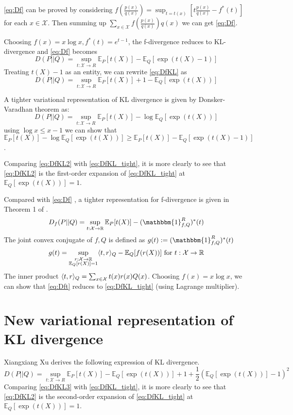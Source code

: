 \documentclass{article}
\theoremstyle{definition}
\DeclarePairedDelimiter{\ip}{\langle}{\rangle}
\begin{document}
\eqref{eq:Df} can be proved by considering
$f(\frac{p(x)}{q(x)}) = \sup_{t=t(x)} [t\frac{p(x)}{q(x)} - f^*(t)] $
for each $x\in \mathcal{X}$. Then summing up $\sum_{x\in\mathcal{X}} f(\frac{p(x)}{q(x)}) q(x)$
we can get \eqref{eq:Df}.

Choosing $f(x)=x\log x, f^*(t)=e^{t-1}$, the f-divergence reduces to KL-divergence and
\eqref{eq:Df} becomes
\begin{equation}\label{eq:DfKL}
D(P||Q) = \sup_{t: \mathcal{X} \to R} \mathbb{E}_P[t(X)] - \mathbb{E}_Q[\exp(t(X)-1)]
\end{equation}
Treating $t(X)-1$ as an entity, we can rewrite \eqref{eq:DfKL}
as
\begin{equation}\label{eq:DfKL2}
D(P||Q) = \sup_{t: \mathcal{X} \to R} \mathbb{E}_P[t(X)] + 1 - \mathbb{E}_Q[\exp(t(X))]
\end{equation}

A tighter variational representation of KL divergence is given 
by Donsker-Varadhan theorem as:
\begin{equation}\label{eq:DfKL_tight}
D(P||Q) = \sup_{t: \mathcal{X} \to R} \mathbb{E}_P[t(X)] - \log\mathbb{E}_Q[\exp(t(X))]
\end{equation}
using $\log x \leq x-1$ we can show that
$\mathbb{E}_P[t(X)] - \log\mathbb{E}_Q[\exp(t(X))]
\geq \mathbb{E}_P[t(X)] - \mathbb{E}_Q[\exp(t(X)-1)]$.

Comparing \eqref{eq:DfKL2} with \eqref{eq:DfKL_tight}, it is more clearly to see that 
\eqref{eq:DfKL2} is the first-order expansion of \eqref{eq:DfKL_tight} at $\mathbb{E}_Q[\exp(t(X))]=1$.

Compared with \eqref{eq:Df}
, a tighter representation for f-divergence is given in Theorem 1 of
\cite{imp}.
\begin{equation}\label{eq:Dft}
D_f(P||Q) = \sup_{t: \mathcal{X} \to \mathbb{R}} \mathbb{E}_P[t(X)] -  (\mathbbm{1}^R_{f,Q})^* (t)
\end{equation}
The joint convex conjugate of $f,Q$ is defined as $g(t) := (\mathbbm{1}^R_{f,Q})^*(t) $
\begin{equation}
g(t) = \sup_{\substack{r: \mathcal{X} \to \mathbb{R} \\ \mathbb{E}_Q[r(X)] = 1}} \ip{t,r}_Q - \mathbb{E}_Q[f(r(X))] 
\textrm{ for } t: \mathcal{X} \to \mathbb{R}
\end{equation}
The inner product $\ip{t,r}_Q = \sum_{x\in \mathcal{X}} t(x)r(x)Q(x)$.
Choosing $f(x)=x\log x$, we can show that
\eqref{eq:Dft} reduces to
\eqref{eq:DfKL_tight} (using Lagrange multiplier).
\section{New variational representation of KL divergence}
Xiangxiang Xu derives the following expression of KL divergence.
\begin{equation}\label{eq:DfKL3}
D(P||Q) = \sup_{t: \mathcal{X} \to R} \mathbb{E}_P[t(X)] - \mathbb{E}_Q[\exp(t(X))] +1
+\frac{1}{2}(\mathbb{E}_Q[\exp(t(X))]-1)^2
\end{equation}
Comparing \eqref{eq:DfKL3} with \eqref{eq:DfKL_tight}, it is more clearly to see that 
\eqref{eq:DfKL2} is the second-order expansion of \eqref{eq:DfKL_tight} at $\mathbb{E}_Q[\exp(t(X))]=1$.
\end{document}
